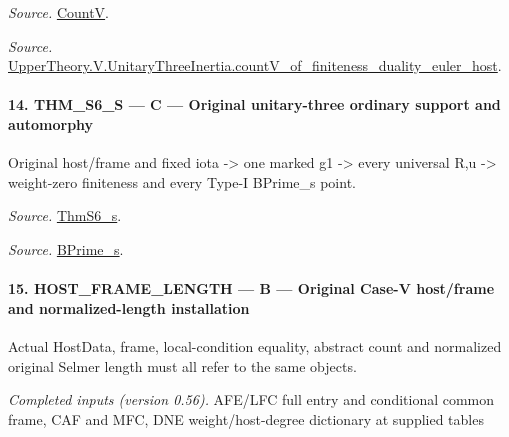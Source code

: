 \emph{Source.} \href{https://github.com/CocoSgt/riemann-hypothesis-lean/blob/7cbf7a0c32fca1badf05931879a37c3f8a2b03b4/src/Development/AutomorphicArithmetic/AutomorphicVarieties/HeightAndVanishing/Counts.lean#L69-L69}{CountV}.

\emph{Source.} \href{https://github.com/CocoSgt/riemann-hypothesis-lean/blob/7cbf7a0c32fca1badf05931879a37c3f8a2b03b4/src/Development/AutomorphicArithmetic/AutomorphicVarieties/ModularityArgument/ThresholdArguments/DenseThresholdCases/CountVOf.lean#L33-L60}{UpperTheory.V.UnitaryThreeInertia.countV\_\allowbreak of\_\allowbreak finiteness\_\allowbreak duality\_\allowbreak euler\_\allowbreak host}.



\paragraph{14. THM\_\allowbreak S6\_\allowbreak S — C — Original unitary-three ordinary support and automorphy}

Original host/frame and fixed iota -> one marked g1 -> every universal R,u -> weight-zero finiteness and every Type-I BPrime\_\allowbreak s point.

\emph{Source.} \href{https://github.com/CocoSgt/riemann-hypothesis-lean/blob/7cbf7a0c32fca1badf05931879a37c3f8a2b03b4/src/Development/AutomorphicArithmetic/AutomorphicVarieties/ModularityArgument/ThresholdArguments/DenseThresholdCases/ThmS6CoreS.lean#L17-L26}{ThmS6\_\allowbreak s}.

\emph{Source.} \href{https://github.com/CocoSgt/riemann-hypothesis-lean/blob/7cbf7a0c32fca1badf05931879a37c3f8a2b03b4/src/Development/AutomorphicArithmetic/AutomorphicVarieties/ModularityArgument/ThresholdArguments/DenseThresholdCases/ThmS6CoreS.lean#L12-L16}{BPrime\_\allowbreak s}.



\paragraph{15. HOST\_\allowbreak FRAME\_\allowbreak LENGTH — B — Original Case-V host/frame and normalized-length installation}

Actual HostData, frame, local-condition equality, abstract count and normalized original Selmer length must all refer to the same objects.

\emph{Completed inputs (version 0.56).} AFE/LFC full entry and conditional common frame, CAF and MFC, DNE weight/host-degree dictionary at supplied tables

